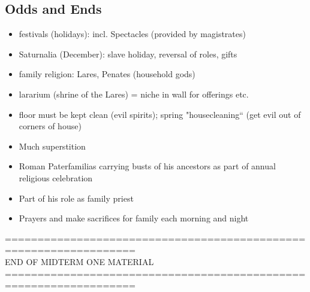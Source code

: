 \documentclass[12pt, twoside]{article}
\begin{document}
\subsection{Odds and Ends}
\begin{itemize}
\item festivals (holidays): incl. Spectacles (provided by magistrates)
\item Saturnalia (December): slave holiday, reversal of roles, gifts
\item family religion: Lares, Penates (household gods)
\item lararium (shrine of the Lares) = niche in wall for offerings etc.
\item floor must be kept clean (evil spirits); spring "housecleaning“ (get evil out of corners of house)
\item Much superstition
\item Roman Paterfamilias carrying busts of his ancestors as part of annual religious celebration
\item Part of his role as family priest
\item Prayers and make sacrifices for family each morning and night
\end{itemize}

================================================================== \\
END OF MIDTERM ONE MATERIAL \\
================================================================== \\
\end{document}
